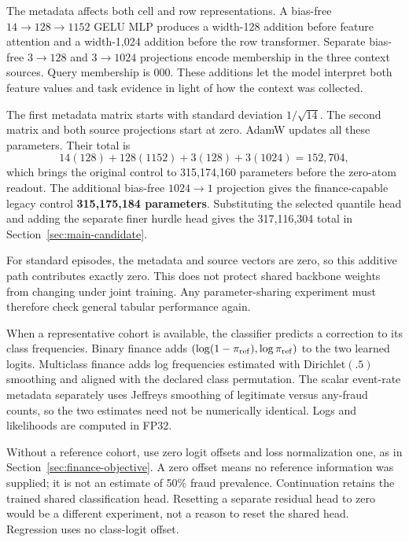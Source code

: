 \documentclass[11pt]{article}
\begin{document}
The metadata affects both cell and row representations. A bias-free $14\to128\to1152$ GELU MLP produces a width-128 addition before feature attention and a width-1,024 addition before the row transformer. Separate bias-free $3\to128$ and $3\to1024$ projections encode membership in the three context sources. Query membership is $000$. These additions let the model interpret both feature values and task evidence in light of how the context was collected.

The first metadata matrix starts with standard deviation $1/\sqrt{14}$. The second matrix and both source projections start at zero. AdamW updates all these parameters. Their total is
\[
14(128)+128(1152)+3(128)+3(1024)=152{,}704,
\]
which brings the original control to 315,174,160 parameters before the zero-atom readout. The additional bias-free $1024\to1$ projection gives the finance-capable legacy control \textbf{315,175,184 parameters}. Substituting the selected quantile head and adding the separate finer hurdle head gives the 317,116,304 total in Section~\ref{sec:main-candidate}.

For standard episodes, the metadata and source vectors are zero, so this additive path contributes exactly zero. This does not protect shared backbone weights from changing under joint training. Any parameter-sharing experiment must therefore check general tabular performance again.

When a representative cohort is available, the classifier predicts a correction to its class frequencies. Binary finance adds $(\log(1-\pi_{\rm ref}),\log\pi_{\rm ref})$ to the two learned logits. Multiclass finance adds log frequencies estimated with Dirichlet$(.5)$ smoothing and aligned with the declared class permutation. The scalar event-rate metadata separately uses Jeffreys smoothing of legitimate versus any-fraud counts, so the two estimates need not be numerically identical. Logs and likelihoods are computed in FP32.

Without a reference cohort, use zero logit offsets and loss normalization one, as in Section~\ref{sec:finance-objective}. A zero offset means no reference information was supplied; it is not an estimate of 50\% fraud prevalence. Continuation retains the trained shared classification head. Resetting a separate residual head to zero would be a different experiment, not a reason to reset the shared head. Regression uses no class-logit offset.
\end{document}
